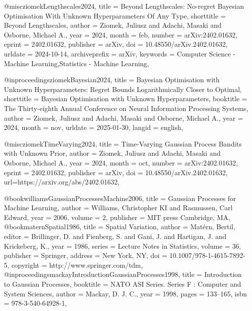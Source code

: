@misc{ziomekLengthscales2024,
  title = {Beyond {{Lengthscales}}: {{No-regret Bayesian Optimisation With Unknown Hyperparameters Of Any Type}}},
  shorttitle = {Beyond {{Lengthscales}}},
  author = {Ziomek, Juliusz and Adachi, Masaki and Osborne, Michael A.},
  year = {2024},
  month = feb,
  number = {arXiv:2402.01632},
  eprint = {2402.01632},
  publisher = {arXiv},
  doi = {10.48550/arXiv.2402.01632},
  urldate = {2024-10-14},
  archiveprefix = {arXiv},
  keywords = {Computer Science - Machine Learning,Statistics - Machine Learning},
}

@inproceedings{ziomekBayesian2024,
  title = {Bayesian {{Optimisation}} with {{Unknown Hyperparameters}}: {{Regret Bounds Logarithmically Closer}} to {{Optimal}}},
  shorttitle = {Bayesian {{Optimisation}} with {{Unknown Hyperparameters}}},
  booktitle = {The {{Thirty-eighth Annual Conference}} on {{Neural Information Processing Systems}}},
  author = {Ziomek, Juliusz and Adachi, Masaki and Osborne, Michael A.},
  year = {2024},
  month = nov,
  urldate = {2025-01-30},
  langid = {english},
}



@misc{ziomekTimeVarying2024,
  title = {Time-{{Varying Gaussian Process Bandits}} with {{Unknown Prior}}},
  author = {Ziomek, Juliusz and Adachi, Masaki and Osborne, Michael A.},
  year = {2024},
  month = oct,
  number = {arXiv:2402.01632},
  eprint = {2402.01632},
  publisher = {arXiv},
  doi = {10.48550/arXiv.2402.01632},
  url={https://arxiv.org/abs/2402.01632}, 
}

@book{williamsGaussianProcessesMachine2006,
  title = {Gaussian Processes for Machine Learning},
  author = {Williams, Christopher KI and Rasmussen, Carl Edward},
  year = {2006},
  volume = {2},
  publisher = {MIT press Cambridge, MA},
}
@book{maternSpatial1986,
  title = {Spatial {{Variation}}},
  author = {Mat{\'e}rn, Bertil},
  editor = {Brillinger, D. and Fienberg, S. and Gani, J. and Hartigan, J. and Krickeberg, K.},
  year = {1986},
  series = {Lecture {{Notes}} in {{Statistics}}},
  volume = {36},
  publisher = {Springer},
  address = {New York, NY},
  doi = {10.1007/978-1-4615-7892-5},
  copyright = {http://www.springer.com/tdm},
}
@inproceedings{mackayIntroductionGaussianProcesses1998,
  title = {Introduction to {{Gaussian}} Processes},
  booktitle = {{{NATO ASI}} Series. {{Series F}} : Computer and System Sciences},
  author = {Mackay, D. J. C.},
  year = {1998},
  pages = {133--165},
  isbn = {978-3-540-64928-1},
}
